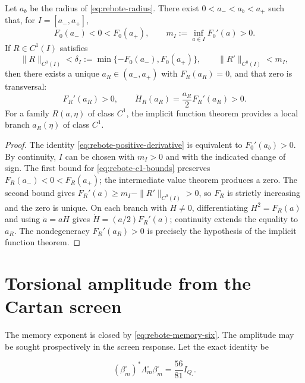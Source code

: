 \begin{theorem}
\label{thm:rebote-c1-persistence}
Let \(a_b\) be the radius of \cref{eq:rebote-radius}. There exist
\(0<a_-<a_b<a_+\) such that, for
\(I=[a_-,a_+]\),
\[
 F_0(a_-)<0<F_0(a_+),
 \qquad
 m_I:=\inf_{a\in I}F_0'(a)>0.
\]
If \(R\in C^1(I)\) satisfies
\begin{equation}
 \|R\|_{C^0(I)}
 <\delta_I
 :=\min\{-F_0(a_-),F_0(a_+)\},
 \qquad
 \|R'\|_{C^0(I)}<m_I,
 \label{eq:rebote-c1-bounds}
\end{equation}
then there exists a unique \(a_R\in(a_-,a_+)\) with \(F_R(a_R)=0\), and
that zero is transversal:
\begin{equation}
 F_R'(a_R)>0,
 \qquad
 \dot H_R(a_R)=\frac{a_R}{2}F_R'(a_R)>0.
 \label{eq:rebote-perturbed-transversality}
\end{equation}
For a family \(R(a,\eta)\) of class \(C^1\), the implicit function
theorem provides a local branch \(a_R(\eta)\) of class \(C^1\).
\end{theorem}

\begin{proof}
The identity \cref{eq:rebote-positive-derivative} is equivalent to \(F_0'(a_b)>0\). By continuity, \(I\) can be chosen with \(m_I>0\) and with the indicated change of sign. The first bound for \cref{eq:rebote-c1-bounds} preserves \(F_R(a_-)<0<F_R(a_+)\); the intermediate value theorem produces a zero. The second bound gives \(F_R'(a)\geq m_I-\|R'\|_{C^0(I)}>0\), so \(F_R\) is strictly increasing and the zero is unique. On each branch with \(H\neq0\), differentiating \(H^2=F_R(a)\) and using \(\dot a=aH\) gives \(\dot H=(a/2)F_R'(a)\); continuity extends the equality to \(a_R\). The nondegeneracy \(F_R'(a_R)>0\) is precisely the hypothesis of the implicit function theorem.
\end{proof}

\section{Torsional amplitude from the Cartan screen}

The memory exponent is closed by
\cref{eq:rebote-memory-six}. The amplitude may be sought prospectively in
the screen response. Let the exact identity be

\begin{equation}
 (\beta_m^{\square})^*\Lambda_m^{\square}\beta_m^{\square}
 =\frac{56}{81}I_{Q_{\square}}.
 \label{eq:rebote-screen-energy}
\end{equation}


